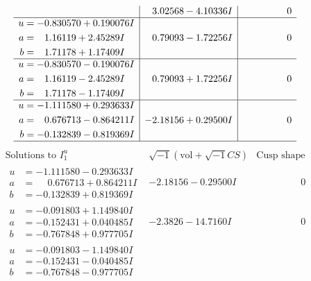 \documentclass[1p]{elsarticle_modified}
\theoremstyle{definition}
\newcommand{\I}{\sqrt{-1}}
\begin{document}
$$\begin{array}{c|c|c}
 & \phantom{-}3.02568 - 4.10336 I & \phantom{-0.000000 } 0 \\ \hline\begin{aligned}
u &= -0.830570 + 0.190076 I \\
a &= \phantom{-}1.16119 + 2.45289 I \\
b &= \phantom{-}1.71178 + 1.17409 I\end{aligned}
 & \phantom{-}0.79093 - 1.72256 I & \phantom{-0.000000 } 0 \\ \hline\begin{aligned}
u &= -0.830570 - 0.190076 I \\
a &= \phantom{-}1.16119 - 2.45289 I \\
b &= \phantom{-}1.71178 - 1.17409 I\end{aligned}
 & \phantom{-}0.79093 + 1.72256 I & \phantom{-0.000000 } 0 \\ \hline\begin{aligned}
u &= -1.111580 + 0.293633 I \\
a &= \phantom{-}0.676713 - 0.864211 I \\
b &= -0.132839 - 0.819369 I\end{aligned}
 & -2.18156 + 0.29500 I & \phantom{-0.000000 } 0\\
 \hline 
 \end{array}$$\newpage$$\begin{array}{c|c|c}  
\text{Solutions to }I^u_{1}& \I (\text{vol} + \sqrt{-1}CS) & \text{Cusp shape}\\
 \hline 
\begin{aligned}
u &= -1.111580 - 0.293633 I \\
a &= \phantom{-}0.676713 + 0.864211 I \\
b &= -0.132839 + 0.819369 I\end{aligned}
 & -2.18156 - 0.29500 I & \phantom{-0.000000 } 0 \\ \hline\begin{aligned}
u &= -0.091803 + 1.149840 I \\
a &= -0.152431 + 0.040485 I \\
b &= -0.767848 + 0.977705 I\end{aligned}
 & -2.3826 - 14.7160 I & \phantom{-0.000000 } 0 \\ \hline\begin{aligned}
u &= -0.091803 - 1.149840 I \\
a &= -0.152431 - 0.040485 I \\
b &= -0.767848 - 0.977705 I\end{aligned}

\end{array}$$
\end{document}
